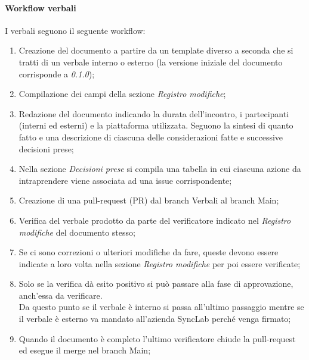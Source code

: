 \documentclass[10pt]{article}
\begin{document}
\begin{justify}
        \paragraph{Workflow verbali}
        I verbali seguono il seguente workflow:
        \begin{enumerate}
            \item Creazione del documento a partire da un template diverso a seconda che si tratti di un verbale interno o esterno (la versione iniziale del documento corrisponde a \textit{0.1.0});
            \item Compilazione dei campi della sezione \textit{Registro modifiche};
            \item Redazione del documento indicando la durata dell'incontro, i partecipanti (interni ed esterni) e la piattaforma utilizzata. Seguono la sintesi di quanto fatto e una descrizione di ciascuna delle considerazioni fatte e successive decisioni prese;
            \item Nella sezione \textit{Decisioni prese} si compila una
            tabella in cui ciascuna azione da intraprendere viene associata ad una issue corrispondente;
            \item Creazione di una pull-request (PR) dal branch Verbali al branch Main;
            \item Verifica del verbale prodotto da parte del verificatore
            indicato nel \textit{Registro modifiche} del documento stesso;
            \item Se ci sono correzioni o ulteriori modifiche da fare, queste devono essere indicate a loro volta nella sezione \textit{Registro modifiche} per poi essere verificate;
            \item Solo se la verifica dà esito positivo si può passare alla fase di approvazione, anch'essa da verificare. \\
            Da questo punto se il verbale è interno si passa all'ultimo passaggio mentre se il verbale è esterno va mandato all'azienda SyncLab perché venga firmato;
            \item Quando il documento è completo l'ultimo verificatore
            chiude la pull-request ed esegue il merge nel branch Main;
        \end{enumerate}


\end{justify}
\end{document}
